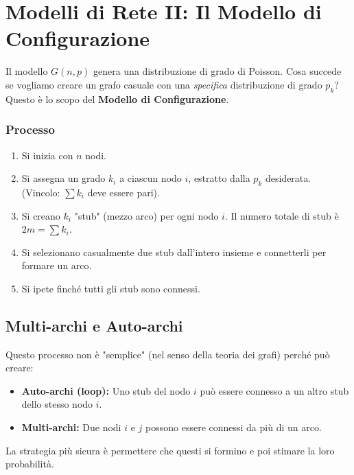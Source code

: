 \newpage
\section{Modelli di Rete II: Il Modello di Configurazione}
Il modello $G(n,p)$ genera una distribuzione di grado di Poisson. Cosa succede se vogliamo creare un grafo casuale con una \textit{specifica} distribuzione di grado $p_k$? Questo è lo scopo del \textbf{Modello di Configurazione}.

\subsubsection{Processo}
\begin{enumerate}
\item Si inizia con $n$ nodi.
\item Si assegna un grado $k_i$ a ciascun nodo $i$, estratto dalla $p_k$ desiderata. (Vincolo: $\sum k_i$ deve essere pari).
\item Si creano $k_i$ "stub" (mezzo arco) per ogni nodo $i$. Il numero totale di stub è $2m = \sum k_i$.
\item Si selezionano casualmente due stub dall'intero insieme e connetterli per formare un arco.
\item Si ipete finché tutti gli stub sono connessi.
\end{enumerate}

\subsection{Multi-archi e Auto-archi}
Questo processo non è "semplice" (nel senso della teoria dei grafi) perché può creare:
\begin{itemize}
\item \textbf{Auto-archi (loop):} Uno stub del nodo $i$ può essere connesso a un altro stub dello stesso nodo $i$.
\item \textbf{Multi-archi:} Due nodi $i$ e $j$ possono essere connessi da più di un arco.
\end{itemize}
La strategia più sicura è permettere che questi si formino e poi stimare la loro probabilità.

